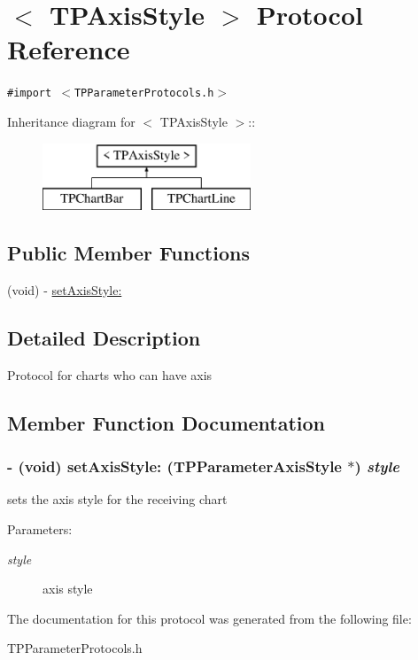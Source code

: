 \hypertarget{protocol_t_p_axis_style-p}{
\section{$<$ TPAxisStyle $>$ Protocol Reference}
\label{protocol_t_p_axis_style-p}
}
{\tt \#import $<$TPParameterProtocols.h$>$}

Inheritance diagram for $<$ TPAxisStyle $>$::\begin{figure}[H]
\begin{center}
\leavevmode
\includegraphics[height=2cm]{protocol_t_p_axis_style-p}
\end{center}
\end{figure}
\subsection*{Public Member Functions}
\begin{CompactItemize}
\item 
(void) - \hyperlink{protocol_t_p_axis_style-p_2e524aea66679aa46e6456b64c9327ec}{setAxisStyle:}
\end{CompactItemize}


\subsection{Detailed Description}
Protocol for charts who can have axis 

\subsection{Member Function Documentation}
\hypertarget{protocol_t_p_axis_style-p_2e524aea66679aa46e6456b64c9327ec}{
\subsubsection[{setAxisStyle:}]{\setlength{\rightskip}{0pt plus 5cm}- (void) setAxisStyle: ({\bf TPParameterAxisStyle} $\ast$) {\em style}}}
\label{protocol_t_p_axis_style-p_2e524aea66679aa46e6456b64c9327ec}


sets the axis style for the receiving chart \begin{Desc}
\item[Parameters:]
\begin{description}
\item[{\em style}]axis style \end{description}
\end{Desc}


The documentation for this protocol was generated from the following file:\begin{CompactItemize}
\item 
TPParameterProtocols.h\end{CompactItemize}
